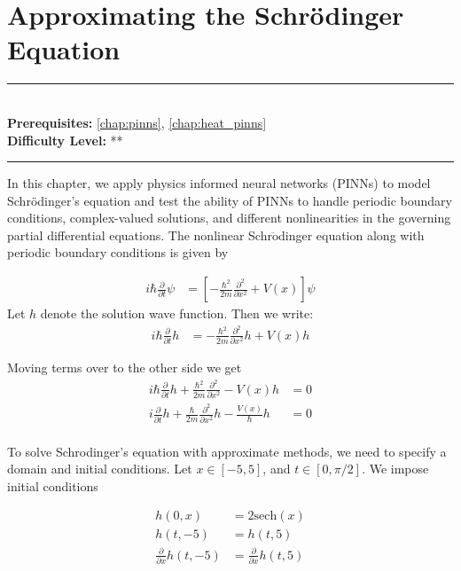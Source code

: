 \documentclass[book.tex]{subfiles}
\begin{document}
\chapter{Approximating the Schr\"{o}dinger Equation}

\label{chap:schrodinger_pinns}
\noindent\rule{11cm}{0.4pt} \\
\textbf{Prerequisites:}  \autoref{chap:pinns}, \autoref{chap:heat_pinns} \\
\textbf{Difficulty Level:} ** \\
\noindent\rule{11cm}{0.4pt}
\vspace{5mm}

In this chapter, we apply physics informed neural networks (PINNs) to model Schr\"{o}dinger's equation and test the ability of PINNs to handle periodic boundary conditions, complex-valued solutions, and different  nonlinearities in the governing partial differential equations. The nonlinear Schr$\mathrm{\ddot{o}}$dinger equation along with periodic boundary conditions is given by

\begin{align}
    i\hbar \frac{\partial}{\partial t} \psi &= \left[ -\frac{\hbar^2}{2m} \frac{\partial^2}{\partial x^2} + V(x) \right ] \psi
\end{align}
Let $h$ denote the solution wave function. Then we write:
\begin{align}
    i\hbar \frac{\partial}{\partial t} h &= -\frac{\hbar^2}{2m} \frac{\partial^2}{\partial x^2} h + V(x) h 
\end{align}

Moving terms over to the other side we get
\begin{align}
    i \hbar \frac{\partial}{\partial t} h + \frac{\hbar^2}{2m} \frac{\partial^2}{\partial x^2}  - V(x) h &= 0 \\
    i \frac{\partial}{\partial t} h + \frac{\hbar}{2m} \frac{\partial^2}{\partial x^2} h - \frac{V(x)}{\hbar} h &= 0 \\
\end{align}

To solve Schrodinger's equation with approximate methods, we need to specify a domain and initial conditions. Let $x \in [-5, 5]$, and $t \in [0,\pi/2]$. We impose initial conditions

\begin{align}
h(0,x) &= 2 \mathrm{sech}(x)\\
h(t,-5) &= h(t, 5)\\
\frac{\partial}{\partial x} h(t,-5) &= \frac{\partial}{\partial x} h(t, 5)
\end{align}
\end{document}
